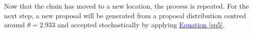 Now that the chain has moved to a new location, the process is repeated. For the next step, a new proposal will be generated from a proposal distribution centred around $\theta = 2.933$ and accepted stochastically by applying \hyperref[eq5]{\textcolor{blue}{Equation} \ref{eq5}}. %

